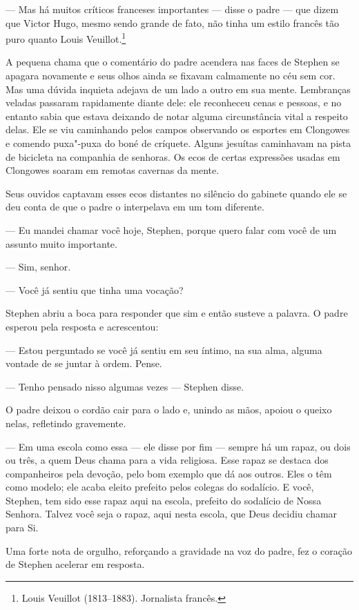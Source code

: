  --- Mas há muitos críticos franceses importantes --- disse o padre --- que dizem
 que Victor Hugo, mesmo sendo grande de fato, não tinha um estilo francês
tão puro quanto Louis Veuillot.\footnote{ Louis Veuillot (1813--1883). Jornalista francês.}

A pequena chama que o comentário do padre acendera nas faces de Stephen
se apagara novamente e seus olhos ainda se fixavam calmamente no céu
sem cor. Mas uma dúvida inquieta adejava de um lado a outro em sua
mente. Lembranças veladas passaram rapidamente diante dele: ele
reconheceu cenas e pessoas, e no entanto sabia que estava deixando de notar
alguma circunstância vital a respeito delas. Ele se viu caminhando
pelos campos observando os esportes em Clongowes e comendo puxa"-puxa do
boné de críquete. Alguns jesuítas caminhavam na pista de bicicleta na
companhia de senhoras. Os ecos de certas expressões usadas em Clongowes
soaram em remotas cavernas da mente.

Seus ouvidos captavam esses ecos distantes no silêncio do gabinete
quando ele se deu conta de que o padre o interpelava em um tom
diferente.

 --- Eu mandei chamar você hoje, Stephen, porque quero falar com você de um
assunto muito importante.

 --- Sim, senhor.

 --- Você já sentiu que tinha uma vocação?

Stephen abriu a boca para responder que sim e então susteve a palavra. O
padre esperou pela resposta e acrescentou:

 --- Estou perguntado se você já sentiu em seu íntimo, na sua alma, alguma
vontade de se juntar à ordem. Pense.

 --- Tenho pensado nisso algumas vezes --- Stephen disse.

O padre deixou o cordão cair para o lado e, unindo as mãos, apoiou o
queixo nelas, refletindo gravemente.

 --- Em uma escola como essa --- ele disse por fim --- sempre há um rapaz, ou
dois ou três, a quem Deus chama para a vida religiosa. Esse rapaz se
destaca dos companheiros pela devoção, pelo bom exemplo que dá aos
outros. Eles o têm como modelo; ele acaba eleito prefeito pelos colegas
do sodalício. E você, Stephen, tem sido esse rapaz aqui na escola,
prefeito do sodalício de Nossa Senhora. Talvez você seja o rapaz, aqui
nesta escola, que Deus decidiu chamar para Si.

Uma forte nota de orgulho, reforçando a gravidade na voz do padre, fez o
coração de Stephen acelerar em resposta.

